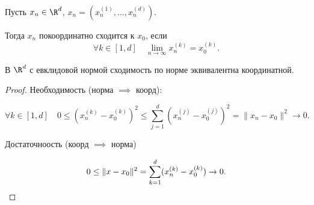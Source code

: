\begin{definition} \thmslashn 

    Пусть $x_{n}\in \R^{d}$, $x_{n} = (x_n^{(1)}, \ldots, x_{n}^{(d)})$.

    Тогда $x_{n}$ покоординатно сходится к $x_0$, если
    \[ \forall{k\in [1, d]}\quad \lim\limits_{n \to \infty} x_{n}^{(k)} = x_0^{(k)} .\] 
\end{definition}
\begin{theorem} \thmslashn

    В $\R^{d}$ с евклидовой нормой сходимость по норме эквивалентна координатной.
    \begin{proof} \thmslashn
    
        Необходимость (норма $\implies$ коорд):

        \[ \forall{k\in [1, d]}\quad 0 \le (x_{n}^{(k)} - x_0^{(k)})^2 \le \sum\limits_{j=1}^{d} (x_{n}^{(j)} - x_{0}^{(j)})^2 = \|x_{n} - x_0\|^2 \to 0.\]

    Достаточноость (коорд $\implies$ норма)

    \[ 0 \le \|x - x_0\|^2 = \sum\limits_{k=1}^{d} (x_{n}^{(k)} - x_{0}^{(k)}) \to 0. \qedhere\] 
    \end{proof}
\end{theorem}
